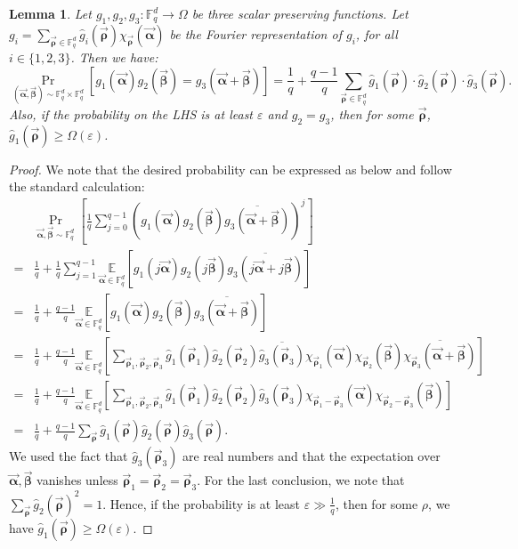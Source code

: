\documentclass[10pt,a4paper]{article}
\newcommand{\F}{\mathbb{F}}
\newtheorem{lemma}[theorem]{Lemma}
\renewcommand{\epsilon}{\varepsilon}
\newcommand{\alphab}{\vec{\bm{\alpha}}}
\newcommand{\betab}{\vec{\bm{\beta}}}
\newcommand{\rhob}{\vec{\bm{\rho}}}
\begin{document}
\begin{lemma}\label{lem:lintestcoeff}
Let $g_1,g_2,g_3:\F_q^d\to\Omega$ be three scalar preserving functions. Let $g_i=\underset{\rhob\in\F_q^d}{\sum}\hat{g}_i(\rhob)\chi_{\rhob}(\alphab)$ be the Fourier representation of $g_i$, for all $i\in\{1,2,3\}$. Then we have:
$$
\Pr_{(\alphab,\betab)\sim \F_q^d\times \F_q^d}[g_1(\alphab)g_2(\betab)=g_3(\alphab+\betab)]=\frac{1}{q}+\frac{q-1}{q}\sum_{\rhob\in\F_q^d} \hat{g}_1(\rhob)\cdot \hat{g}_2(\rhob)\cdot {\hat{g}_3(\rhob)}.
$$
Also, if the probability on the LHS is at least $\epsilon$ and $g_2=g_3$, then for some $\rhob$, $\hat{g}_1(\rhob) \geq \Omega(\epsilon)$. 
\end{lemma}\begin{proof} We note that the desired probability can be expressed as below and follow the standard calculation: 
\begin{align*}
& \underset{\alphab,\betab\sim\F_q^d}{\Pr}\left[ \frac{1}{q} \sum_{j=0}^{q-1} (g_1(\alphab)g_2(\betab)\overline{g_3(\alphab+\betab)})^j  \right] \\ 
= & \frac{1}{q} + \frac{1}{q} \sum_{j=1}^{q-1}  \underset{\alphab\in\F_q^d}{\mathbb{E}}\left[ g_1(j\alphab)g_2(j\betab)\overline{g_3(j\alphab+j\betab)}  \right]\\
= & \frac{1}{q} + \frac{q-1}{q}  \underset{\alphab\in\F_q^d}{\mathbb{E}}\left[ g_1(\alphab)g_2(\betab)\overline{g_3(\alphab+\betab)}  \right]\\
= & \frac{1}{q} + \frac{q-1}{q}  \underset{\alphab\in\F_q^d}{\mathbb{E}}\left[ \sum_{{\rhob}_1, {\rhob}_2, {\rhob}_3 } 
\hat{g}_1({\rhob}_1)\hat{g}_2({\rhob}_2)  \overline{\hat{g}_3({\rhob}_3)}   \chi_{\rhob_1}(\alphab) \chi_{\rhob_2}(\betab) 
\overline{\chi_{\rhob_3}(\alphab+\betab)} 
 \right]\\
 = & \frac{1}{q} + \frac{q-1}{q}  \underset{\alphab\in\F_q^d}{\mathbb{E}}\left[ \sum_{{\rhob}_1, {\rhob}_2, {\rhob}_3 }
\hat{g}_1({\rhob}_1)\hat{g}_2({\rhob}_2)  \hat{g}_3({\rhob}_3)   \chi_{\rhob_1-\rhob_3}(\alphab) \chi_{\rhob_2-\rhob_3}(\betab)
 \right]\\
 = & \frac{1}{q} + \frac{q-1}{q}   \sum_{\rhob }
\hat{g}_1({\rhob})\hat{g}_2({\rhob})  \hat{g}_3({\rhob}).  
\end{align*} 
We used the fact that $\hat{g}_3(\rhob_3)$ are real numbers and that the expectation over $\alphab, \betab$ vanishes unless 
$\rhob_1 = \rhob_2 = \rhob_3$. 
For the last conclusion, we note that $\sum_{\rhob} \hat{g}_2(\rhob)^2 = 1$.  Hence, if the probability is at least $\epsilon \gg \frac{1}{q}$,
then for some $\rho$, we have $\hat{g}_1(\rhob) \geq \Omega(\epsilon)$.  \qedhere 
\end{proof}
\end{document}
